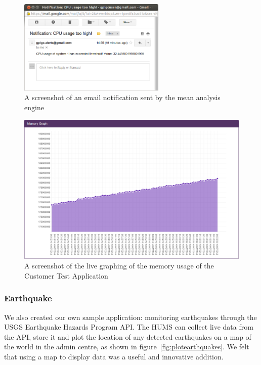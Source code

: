 \documentclass[10pt,a4paper]{article}
\begin{document}

\begin{figure}[htbp!]
  \centering
  \includegraphics[width=7cm]{images/TestApplicationCPUAlert.png}
  \caption{A screenshot of an email notification sent by the mean analysis engine}
  \label{fig:alerting}
\end{figure}

\begin{figure}[htbp!]
  \centering
  \includegraphics[width=12cm]{images/TestApplicationMemoryGraph.png}
  \caption{A screenshot of the live graphing of the memory usage of the Customer 
  Test Application}
  \label{fig:graphing}
\end{figure}

\subsubsection{Earthquake}
We also created our own sample application: monitoring earthquakes 
through the USGS Earthquake Hazards Program API. The HUMS
can collect live data from the API, store it and plot the location of any
detected earthquakes on a map of the world in the admin centre, as shown
in figure~\ref{fig:plotearthquakes}. We felt that using a map to display
data was a useful and innovative addition.
\end{document}
